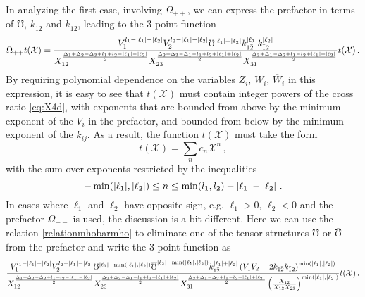 \documentclass{article}
\def\mK{k}
\begin{document}
In analyzing the first 
case, involving $\Omega_{++}$, we can express the prefactor in terms of 
$\mho$, $\mK_{1\bar{2}}$ and $\mK_{\bar{1}2}$, leading to the 3-point function
\begin{equation}
    \Omega_{++}t(\mathcal{X})=
    \frac{V_1^{l_1-\abs{\ell_1}-\abs{\ell_2}}V_2^{l_2-\abs{\ell_1}-\abs{\ell_2}}
    \mho^{\abs{\ell_1}+\abs{\ell_2}}\mK_{1\bar{2}}^{\abs{\ell_1}}
    \mK_{\bar{1}2}^{\abs{\ell_2}}}
    {X_{12}^{\frac{\Delta_1+\Delta_2-\Delta_3+l_1+l_2-\abs{\ell_1}-\abs{\ell_2}}{2}}
    X_{23}^{\frac{\Delta_2+\Delta_3-\Delta_1-l_1+l_2+\abs{\ell_1}+\abs{\ell_2}}{2}}
    X_{31}^{\frac{\Delta_3+\Delta_1-\Delta_2+l_1-l_2+\abs{\ell_1}+\abs{\ell_2}}{2}}}
    t(\mathcal{X})\, . 
    \label{prefactor_self-self}
\end{equation}
By requiring polynomial dependence on the variables $Z_i$, $W_i$, $\overline{W}_i$ in this expression, it is easy to see that $t(\mathcal{X})$ must contain integer 
powers of the cross ratio \eqref{eq:X4d}, with exponents that are bounded from above 
by the minimum exponent of the $V_i$ in the prefactor, and bounded from below 
by the minimum exponent of the $\mK_{ij}$. As a result, the function $t(\mathcal{X})$ must 
take the form 
\begin{equation}
    t(\mathcal{X})=\sum_n c_n \mathcal{X}^n\,,
\end{equation}
with the sum over exponents restricted by the inequalities
\begin{equation} \label{eq:nconstraint}
-\min(\abs{\ell_1},\abs{\ell_2})\le n\le \min(l_1,l_2)-\abs{\ell_1}-\abs{\ell_2}\ . 
\end{equation} 
In cases where $\ell_1$ and $\ell_2$ have opposite sign, e.g. $\ell_1>0$, $\ell_2<0$ and the prefactor $\Omega_{+-}$ is used, the discussion is a bit 
different. Here we can use the relation
\eqref{relationmhobarmho} to eliminate one of the tensor structures $\mho$ or 
$\overline \mho$ from the prefactor and write the 3-point function as 
$$
    \frac{V_1^{l_1-\abs{\ell_1}-\abs{\ell_2}}V_2^{l_2-\abs{\ell_1}-\abs{\ell_2}}
    \mho^{\abs{\ell_1}-\min(\abs{\ell_1},\abs{\ell_2})}\overline{\mho}^{\abs{\ell_2}-
    \min(\abs{\ell_1},\abs{\ell_2})}\mK_{1\bar{2}}^{\abs{\ell_1}+\abs{\ell_2}}
    \left( V_1 V_2 -2\mK_{1\bar{2}}\mK_{\bar{1}2}\right)^{\min(\abs{\ell_1},\abs{\ell_2})}}
    {X_{12}^{\frac{\Delta_1+\Delta_2-\Delta_3+l_1+l_2-\abs{\ell_1}-\abs{\ell_2}}{2}}
    X_{23}^{\frac{\Delta_2+\Delta_3-\Delta_1-l_1+l_2+\abs{\ell_1}+\abs{\ell_2}}{2}}
    X_{31}^{\frac{\Delta_3+\Delta_1-\Delta_2+l_1-l_2+\abs{\ell_1}+\abs{\ell_2}}{2}}
    \left(\frac{X_{12}}{X_{13}X_{23}}\right)^{\min(\abs{\ell_1},\abs{\ell_2})}}
    t(\mathcal{X})\, . 
$$
\end{document}
